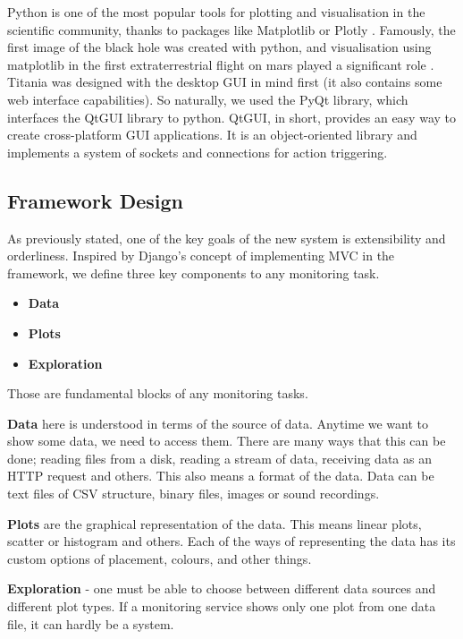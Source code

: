 Python is one of the most popular tools for plotting and visualisation in the scientific community, thanks to packages like Matplotlib\cite{Hunter:2007} or Plotly \cite{plotly}.
Famously, the first image of the black hole \cite{blackhole} was created with python, and visualisation using matplotlib in the first extraterrestrial flight on mars played a significant role \cite{ingenuity}.
Titania was designed with the desktop GUI in mind first (it also contains some web interface capabilities).
So naturally, we used the PyQt library, which interfaces the QtGUI library to python.
QtGUI, in short, provides an easy way to create cross-platform GUI applications.
It is an object-oriented library and implements a system of sockets and connections for action triggering.

\subsection{Framework Design}

As previously stated, one of the key goals of the new system is extensibility and orderliness.
Inspired by Django's concept of implementing MVC in the framework, we define three key components to any monitoring task.

\begin{itemize}
  \item \textbf{Data}
  \item \textbf{Plots}
  \item \textbf{Exploration}
\end{itemize}

Those are fundamental blocks of any monitoring tasks.


\textbf{Data} here is understood in terms of the source of data. Anytime we want to show some data, we need to access them.
There are many ways that this can be done; reading files from a disk, reading a stream of data, receiving data as an HTTP request and others.
This also means a format of the data. Data can be text files of CSV structure, binary files, images or sound recordings.

\textbf{Plots} are the graphical representation of the data. This means linear plots, scatter or histogram and others. Each of the ways of representing the data has its custom options of placement, colours, and other things.

\textbf{Exploration} - one must be able to choose between different data sources and different plot types. If a monitoring service shows only one plot from one data file, it can hardly be a system.


